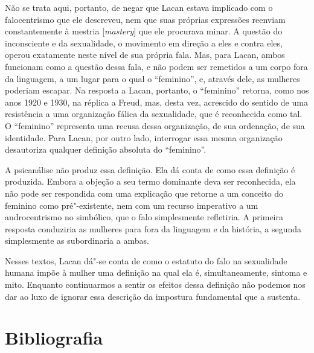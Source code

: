 Não se trata aqui, portanto, de negar que Lacan estava implicado com o
falocentrismo que ele descreveu, nem que suas próprias expressões
reenviam constantemente à mestria {[}\emph{mastery}{]} que ele procurava
minar. A questão do inconsciente e da sexualidade, o movimento em
direção a eles e contra eles, operou exatamente neste nível de sua
própria fala. Mas, para Lacan, ambos funcionam como a questão dessa
fala, e não podem ser remetidos a um corpo fora da linguagem, a um lugar
para o qual o ``feminino'', e, através dele, as mulheres poderiam
escapar. Na resposta a Lacan, portanto, o ``feminino'' retorna, como nos
anos 1920 e 1930, na réplica a Freud, mas, desta vez, acrescido do
sentido de uma resistência a uma organização fálica da sexualidade, que
é reconhecida como tal. O ``feminino'' representa uma recusa dessa
organização, de sua ordenação, de sua identidade. Para Lacan, por outro
lado, interrogar essa mesma organização desautoriza qualquer definição
absoluta do ``feminino''.

A psicanálise não produz essa definição. Ela dá conta de como essa
definição é produzida. Embora a objeção a seu termo dominante deva ser
reconhecida, ela não pode ser respondida com uma explicação que retorne
a um conceito do feminino como pré"-existente, nem com um recurso
imperativo a um androcentrismo no simbólico, que o falo simplesmente
refletiria. A primeira resposta conduziria as mulheres para fora da
linguagem e da história, a segunda simplesmente as subordinaria a ambas.

Nesses textos, Lacan dá"-se conta de como o estatuto do falo na
sexualidade humana impõe à mulher uma definição na qual ela é,
simultaneamente, sintoma e mito. Enquanto continuarmos a sentir os
efeitos dessa definição não podemos nos dar ao luxo de ignorar essa
descrição da impostura fundamental que a sustenta.

\section{Bibliografia}

